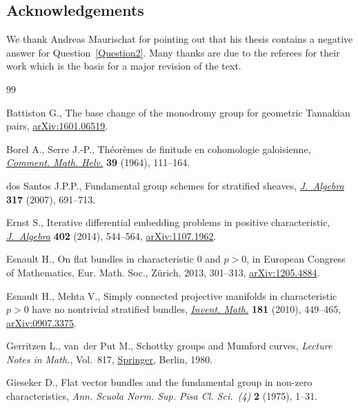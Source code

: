 \documentclass[pdftex]{sigma}
\numberwithin{equation}{section}
\begin{document}
\subsection*{Acknowledgements} We thank Andreas Maurischat for pointing out that his thesis contains a negative answer for Question~\ref{Question2}. Many thanks are due to the referees for their work which is the basis for a major revision of the text.

\begin{thebibliography}{99}
\footnotesize\itemsep=0pt

Battiston G., The base change of the monodromy group for geometric {T}annakian
 pairs, \href{https://arxiv.org/abs/1601.06519}{arXiv:1601.06519}.

Borel A., Serre J.-P., Th\'eor\`emes de finitude en cohomologie galoisienne,
 \href{https://doi.org/10.1007/BF02566948}{\textit{Comment. Math. Helv.}} \textbf{39} (1964), 111--164.

dos Santos J.P.P., Fundamental group schemes for stratified sheaves,
 \href{https://doi.org/10.1016/j.jalgebra.2007.03.005}{\textit{J.~Algebra}} \textbf{317} (2007), 691--713.

Ernst S., Iterative differential embedding problems in positive characteristic,
 \href{https://doi.org/10.1016/j.jalgebra.2013.12.023}{\textit{J.~Algebra}} \textbf{402} (2014), 544--564, \href{https://arxiv.org/abs/1107.1962}{arXiv:1107.1962}.

Esnault H., On flat bundles in characteristic 0 and {$p>0$}, in European
 {C}ongress of {M}athematics, Eur. Math. Soc., Z\"{u}rich, 2013, 301--313,
 \href{https://arxiv.org/abs/1205.4884}{arXiv:1205.4884}.

Esnault H., Mehta V., Simply connected projective manifolds in characteristic
 {$p>0$} have no nontrivial stratified bundles, \href{https://doi.org/10.1007/s00222-010-0250-2}{\textit{Invent. Math.}}
 \textbf{181} (2010), 449--465, \href{https://arxiv.org/abs/0907.3375}{arXiv:0907.3375}.

Gerritzen L., van~der Put M., Schottky groups and {M}umford curves,
 \textit{Lecture Notes in Math.}, Vol.~817, \href{https://doi.org/10.1007/BFb0089957}{Springer}, Berlin, 1980.

Gieseker D., Flat vector bundles and the fundamental group in non-zero
 characteristics, \textit{Ann. Scuola Norm. Sup. Pisa Cl. Sci.~(4)} \textbf{2}
 (1975), 1--31.


\end{thebibliography}
\end{document}
